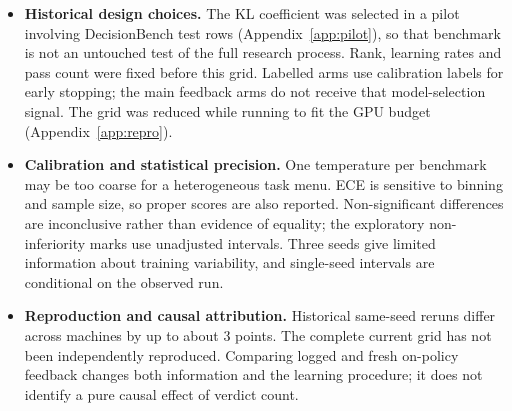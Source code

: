 \begin{itemize}
\item \textbf{Historical design choices.} The KL coefficient was selected in a pilot involving DecisionBench test rows (Appendix~\ref{app:pilot}), so that benchmark is not an untouched test of the full research process. Rank, learning rates and pass count were fixed before this grid. Labelled arms use calibration labels for early stopping; the main feedback arms do not receive that model-selection signal. The grid was reduced while running to fit the GPU budget (Appendix~\ref{app:repro}).
\item \textbf{Calibration and statistical precision.} One temperature per benchmark may be too coarse for a heterogeneous task menu. ECE is sensitive to binning and sample size, so proper scores are also reported. Non-significant differences are inconclusive rather than evidence of equality; the exploratory non-inferiority marks use unadjusted intervals. Three seeds give limited information about training variability, and single-seed intervals are conditional on the observed run.
\item \textbf{Reproduction and causal attribution.} Historical same-seed reruns differ across machines by up to about 3 points. The complete current grid has not been independently reproduced. Comparing logged and fresh on-policy feedback changes both information and the learning procedure; it does not identify a pure causal effect of verdict count.
\end{itemize}

